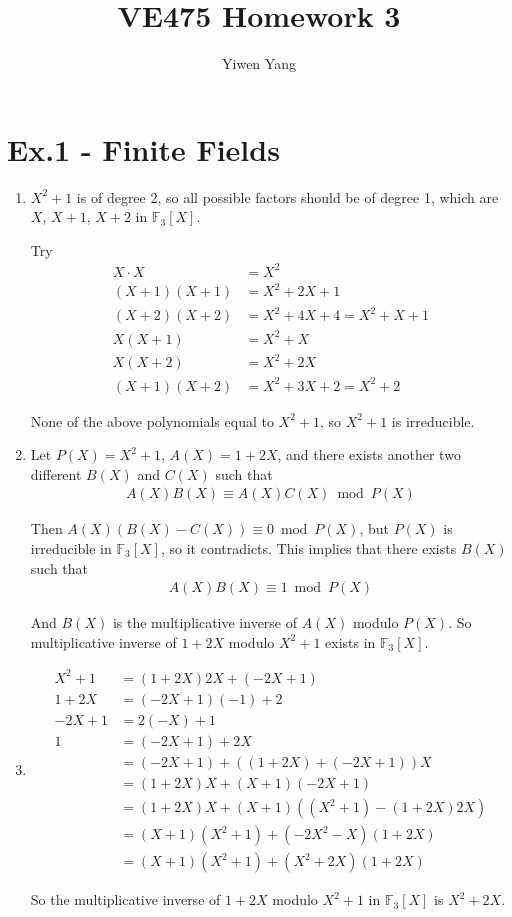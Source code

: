 \documentclass[12pt]{article}
\title{VE475 Homework 3}
\author{Yiwen Yang}
\begin{document}
\date{}
\maketitle

\section*{Ex.1 - Finite Fields}

\begin{enumerate}
	\item
		$X^2+1$ is of degree 2, so all possible factors should be of degree 1, which are $X$, $X + 1$, $X + 2$ in $\mathbb{F}_3[X]$.

		Try
		\begin{align*}
			X \cdot X&=X^2\\
			(X+1)(X+1)&=X^2+2X+1\\
			(X+2)(X+2)&=X^2+4X+4=X^2+X+1\\
			X(X+1)&=X^2+X\\
			X(X+2)&=X^2+2X\\
			(X+1)(X+2)&=X^2+3X+2=X^2+2
		\end{align*}

		None of the above polynomials equal to $X^2+1$, so $X^2+1$ is irreducible.
	\item
		Let $P(X)=X^2+1$, $A(X)=1+2X$, and there exists another two different $B(X)$ and $C(X)$ such that
		\begin{align*}
			A(X)B(X) \equiv A(X)C(X) \bmod P(X)
		\end{align*}

		Then $A(X)(B(X)-C(X)) \equiv 0 \bmod P(X)$, but $P(X)$ is irreducible in $\mathbb{F}_3[X]$, so it contradicts. This implies that there exists $B(X)$ such that 
		\begin{align*}
			A(X)B(X) \equiv 1 \bmod P(X)
		\end{align*}

		And $B(X)$ is the multiplicative inverse of $A(X)$ modulo $P(X)$. So multiplicative inverse of $1+2X$ modulo $X^2+1$ exists in $\mathbb{F}_3[X]$.
	\item
		\begin{align*}
			X^2+1 &= (1+2X)2X+(-2X+1)\\
			1+2X &= (-2X+1)(-1)+2\\
			-2X+1 &= 2(-X)+1\\
			1 &= (-2X+1)+2X\\
			&= (-2X+1)+((1+2X)+(-2X+1))X\\
			&= (1+2X)X+(X+1)(-2X+1)\\
			&= (1+2X)X+(X+1)((X^2+1)-(1+2X)2X)\\
			&= (X+1)(X^2+1)+(-2X^2-X)(1+2X)\\
			&= (X+1)(X^2+1)+(X^2+2X)(1+2X)
		\end{align*}

		So the multiplicative inverse of $1+2X$ modulo $X^2+1$ in $\mathbb{F}_3[X]$ is $X^2+2X$.
\end{enumerate}
\end{document}
